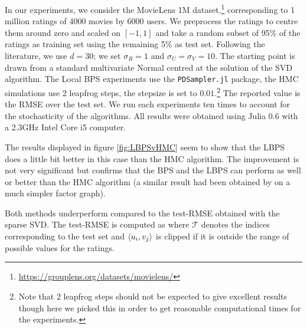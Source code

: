 In our experiments, we consider the MovieLens 1M dataset.\footnote{\url{https://grouplens.org/datasets/movielens/}} corresponding to 1 million ratings of 4000 movies by 6000 users. 
We preprocess the ratings to centre them around zero and scaled on $[-1, 1]$ and take a random subset of 95\% of the ratings as training set using the remaining 5\% as test set. 
Following the literature, we use $d=30$; we set $\sigma_{R}=1$ and $\sigma_{U}=\sigma_{V}=10$. The starting point is drawn from a standard multivariate Normal centred at the solution of the SVD algorithm. The Local BPS experiments use the \texttt{PDSampler.jl} package, the HMC simulations use 2 leapfrog steps, the stepsize is set to $0.01$.\footnote{Note that 2 leapfrog steps should not be expected to give excellent results though here we picked this in order to get reasonable computational times for the experiments.}
The reported value is the RMSE over the test set. We run each experiments ten times to account for the stochasticity of the algorithms. All results were obtained using Julia 0.6 with a 2.3GHz Intel Core i5 computer. 


The results displayed in figure \ref{fig:LBPSvHMC} seem to show that the LBPS does a little bit better in this case than the HMC algorithm. The improvement is not very significant but confirms that the BPS and the LBPS can perform as well or better than the HMC algorithm (a similar result had been obtained by \citep{bouchard15} on a much simpler factor graph). 

Both methods underperform compared to the test-RMSE obtained with the sparse SVD. The test-RMSE is computed as
%
%
where $\mathcal T$ denotes the indices corresponding to the test set and $\left\langle u_{i}, v_{j} \right\rangle$ is clipped if it is outside the range of possible values for the ratings. 

\clearpage


